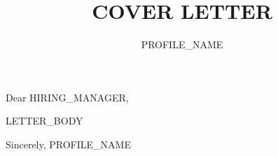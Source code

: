 \documentclass[11pt]{article}
\title{COVER LETTER}
\author{PROFILE_NAME}
\date{}
\begin{document}
\maketitle

Dear HIRING_MANAGER,

LETTER_BODY

Sincerely,
PROFILE_NAME
\end{document}
